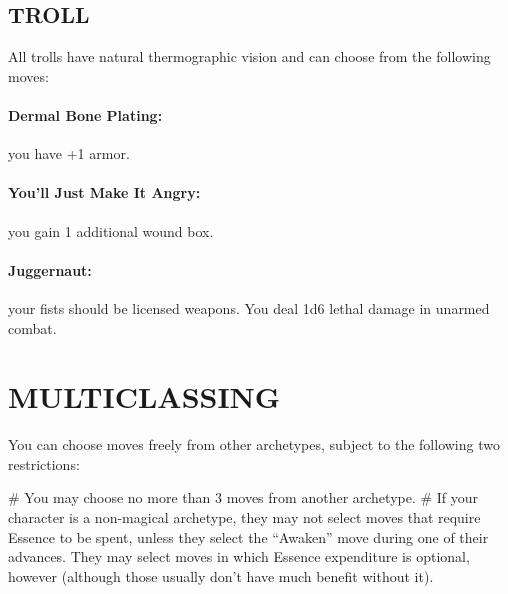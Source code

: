\subsection{TROLL}
All trolls have natural thermographic vision and can choose from the following moves:

\paragraph{Dermal Bone Plating:} you have +1 armor.
\paragraph{You’ll Just Make It Angry:} you gain 1 additional wound box.
\paragraph{Juggernaut:} your fists should be licensed weapons. You deal 1d6 lethal damage in unarmed combat.


\section{MULTICLASSING}

You can choose moves freely from other archetypes, subject to the following two restrictions:

\begin{easylist}
    # You may choose no more than 3 moves from another archetype.
    # If your character is a non-magical archetype, they may not select moves that require Essence to be spent, unless they select the “Awaken” move during one of their advances. They may select moves in which Essence expenditure is optional, however (although those usually don’t have much benefit without it).
\end{easylist}
